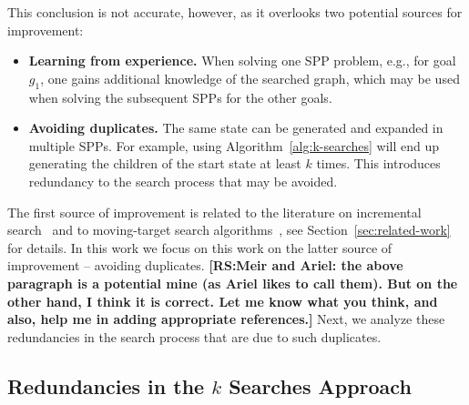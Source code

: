\documentclass{aicom2e}
\newcommand{\roni}[1]{\textbf{[RS:#1]}}
\begin{document}
This conclusion is not accurate, however, as it overlooks two potential sources for improvement:
\begin{itemize}
	\item {\bf Learning from experience.} When solving one SPP problem, e.g., for goal $g_1$, one gains additional knowledge of the searched graph, which may be used when solving the subsequent SPPs for the other goals.
	\item {\bf Avoiding duplicates.} The same state can be generated and expanded in multiple SPPs. For example, using Algorithm~\ref{alg:k-searches} will end up generating the children of the start state at least $k$ times. This introduces redundancy to the search process that may be avoided.  
\end{itemize}
The first source of improvement is related to the literature on incremental search~\cite{koenig2004lifelong} and to moving-target search algorithms~\cite{ishida1995moving,koenig2007speeding}, see Section~\ref{sec:related-work} for details. In this work we focus on this work on the latter source of improvement -- avoiding duplicates. %
\roni{Meir and Ariel: the above paragraph is a potential mine (as Ariel likes to call them). But on the other hand, I think it is correct. Let me know what you think, and also, help me in adding appropriate references.}
Next, we analyze these redundancies in the search process that are due to such duplicates. 

\subsection{Redundancies in the $k$ Searches Approach}
\end{document}
